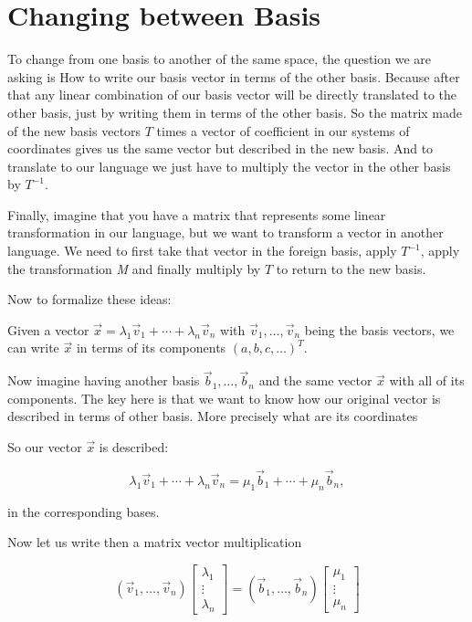 \newpage
\section{Changing between Basis}

To change from one basis to another of the same space, the question we are asking is How to write our basis vector 
in terms of the other basis. Because after that any linear combination of our basis vector will be directly translated 
to the other basis, just by writing them in terms of the other basis. So the matrix made of the new basis vectors 
\(T\) times a vector of coefficient in our systems of coordinates gives us the same vector but described in the new basis.
And to translate to our language we just have to multiply the vector in the other basis by \(T^{-1}\).

Finally, imagine that you have a matrix that represents some linear transformation in our language, but we want to transform 
a vector in another language. We need to first take that vector in the foreign basis, apply \(T^{-1}\), apply the transformation \emph{M} 
and finally multiply by \(T\) to return to the new basis.

Now to formalize these ideas:

Given a vector \(\vec{x} = \lambda_1 \vec{v}_1 + \cdots + \lambda_n \vec{v}_n\) 
with \(\vec{v}_1, \dots, \vec{v}_n\)
being the basis vectors, we can write \(\vec{x}\) in terms of its components \({(a, b, c, \dots)}^T\).

Now imagine having another basis \(\vec{b}_1, \dots, \vec{b}_n\) and the same vector \(\vec{x}\)
with all of its components. The key here is that we want to know how our original
vector is described in terms of other basis. More precisely what are its coordinates

So our vector \(\vec{x}\) is described:

\[
    \lambda_1 \vec{v}_1 + \cdots + \lambda_n \vec{v}_n = \mu_1 \vec{b}_1 + \cdots + \mu_n \vec{b}_n,
\]

in the corresponding bases.

Now let us write then a matrix vector multiplication

\[
    (\vec{v}_1, \dots, \vec{v}_ n) 
    \begin{bmatrix} \lambda_1 \\ \vdots \\ \lambda_n \end{bmatrix}
    =
    (\vec{b}_1, \dots, \vec{b}_ n) 
    \begin{bmatrix} \mu_1 \\ \vdots \\ \mu_n \end{bmatrix}
\]

